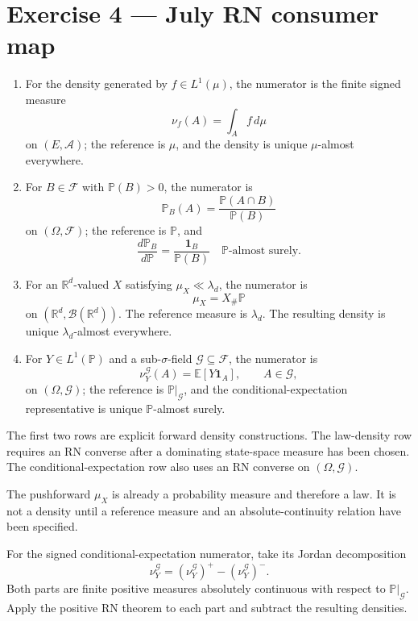 \section*{Exercise 4 — July RN consumer map}

\begin{enumerate}
  \item For the density generated by $f\in L^1(\mu)$, the numerator is the finite signed measure
  \[
  \nu_f(A)=\int_Af\,d\mu
  \]
  on $(E,\mathcal A)$; the reference is $\mu$, and the density is unique $\mu$-almost everywhere.

  \item For $B\in\mathcal F$ with $\mathbb P(B)>0$, the numerator is
  \[
  \mathbb P_B(A)
  =
  \frac{\mathbb P(A\cap B)}{\mathbb P(B)}
  \]
  on $(\Omega,\mathcal F)$; the reference is $\mathbb P$, and
  \[
  \frac{d\mathbb P_B}{d\mathbb P}
  =
  \frac{\mathbf 1_B}{\mathbb P(B)}
  \quad\mathbb P\text{-almost surely}.
  \]

  \item For an $\mathbb R^d$-valued $X$ satisfying $\mu_X\ll\lambda_d$, the numerator is
  \[
  \mu_X=X_\#\mathbb P
  \]
  on $(\mathbb R^d,\mathcal B(\mathbb R^d))$. The reference measure is $\lambda_d$. The resulting density is unique $\lambda_d$-almost everywhere.

  \item For $Y\in L^1(\mathbb P)$ and a sub-$\sigma$-field $\mathcal G\subseteq\mathcal F$, the numerator is
  \[
  \nu_Y^{\mathcal G}(A)
  =
  \mathbb E[Y\mathbf 1_A],
  \qquad A\in\mathcal G,
  \]
  on $(\Omega,\mathcal G)$; the reference is $\mathbb P|_{\mathcal G}$, and the conditional-expectation representative is unique $\mathbb P$-almost surely.
\end{enumerate}

The first two rows are explicit forward density constructions. The law-density row requires an RN converse after a dominating state-space measure has been chosen. The conditional-expectation row also uses an RN converse on $(\Omega,\mathcal G)$.

The pushforward $\mu_X$ is already a probability measure and therefore a law. It is not a density until a reference measure and an absolute-continuity relation have been specified.

For the signed conditional-expectation numerator, take its Jordan decomposition
\[
\nu_Y^{\mathcal G}
=
(\nu_Y^{\mathcal G})^+
-
(\nu_Y^{\mathcal G})^-.
\]
Both parts are finite positive measures absolutely continuous with respect to $\mathbb P|_{\mathcal G}$. Apply the positive RN theorem to each part and subtract the resulting densities.

